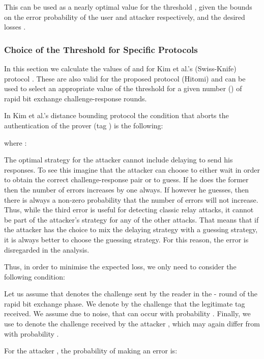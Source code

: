 \documentclass{article}
\begin{document}
This can be used as a nearly optimal value for the threshold , given
the bounds  on the error probability of the user and attacker
respectively, and the desired losses .

\subsubsection{Choice of the Threshold for Specific Protocols}

In this section we  calculate the values of  and  for Kim et al.'s (Swiss-Knife) protocol \cite{KimAKSP-2008-icisc}. These are also valid for the proposed protocol (Hitomi) and can be used to select an appropriate value of the threshold  for a given number () of rapid bit exchange challenge-response rounds.

In Kim et al.'s distance bounding protocol the condition that aborts  the authentication of the prover (tag ) is the following:

where :



The optimal strategy for the attacker cannot include delaying to send his responses.
To see this imagine that the attacker can choose to either wait in order to obtain the correct challenge-response pair or to guess. If he does the former then the number of errors  increases by one always. If however he guesses, then there is always a non-zero probability that the number of errors will not increase.
Thus, while the third error  is useful for detecting classic relay attacks, it cannot be part of the attacker's strategy for any of the other attacks. That means that if the attacker has the choice to mix the delaying strategy with a guessing strategy, it is always better to choose the guessing strategy. For this reason, the error  is disregarded in the analysis.


Thus, in order to minimise the expected loss, we only need to consider the following condition:



Let us assume that  denotes the challenge sent by the reader in
the - round of the rapid bit exchange phase. We denote by
 the challenge that the legitimate tag  received. We assume
due to noise, that  can occur with probability .  Finally, we use  to denote the challenge
received by the attacker , which may again differ from  with
probability .







For the attacker , the probability of making an error  is:
\end{document}
